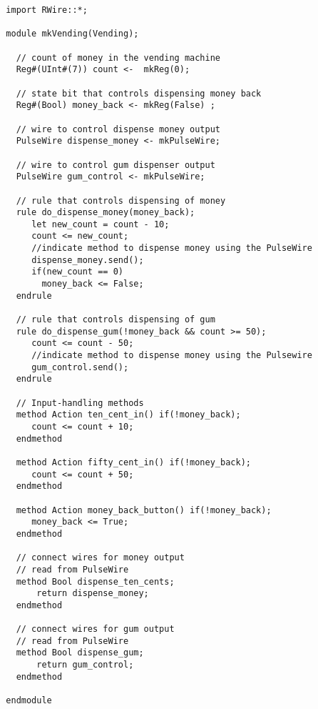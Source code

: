 \begin{verbatim}
  import RWire::*;

  module mkVending(Vending);

    // count of money in the vending machine
    Reg#(UInt#(7)) count <-  mkReg(0);

    // state bit that controls dispensing money back
    Reg#(Bool) money_back <- mkReg(False) ;

    // wire to control dispense money output
    PulseWire dispense_money <- mkPulseWire;

    // wire to control gum dispenser output
    PulseWire gum_control <- mkPulseWire;

    // rule that controls dispensing of money
    rule do_dispense_money(money_back);
       let new_count = count - 10;
       count <= new_count;
       //indicate method to dispense money using the PulseWire
       dispense_money.send();
       if(new_count == 0)
         money_back <= False;
    endrule

    // rule that controls dispensing of gum
    rule do_dispense_gum(!money_back && count >= 50);
       count <= count - 50;
       //indicate method to dispense money using the Pulsewire
       gum_control.send();
    endrule

    // Input-handling methods
    method Action ten_cent_in() if(!money_back);
       count <= count + 10;
    endmethod

    method Action fifty_cent_in() if(!money_back);
       count <= count + 50;
    endmethod     

    method Action money_back_button() if(!money_back);
       money_back <= True;
    endmethod

    // connect wires for money output
    // read from PulseWire
    method Bool dispense_ten_cents;
        return dispense_money;
    endmethod

    // connect wires for gum output
    // read from PulseWire
    method Bool dispense_gum;
        return gum_control;
    endmethod
  
  endmodule
\end{verbatim}

